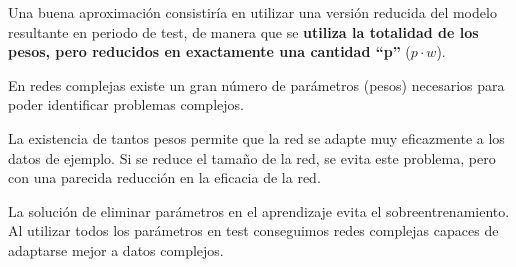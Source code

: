 \documentclass[12pt, twoside, openright]{report} %
\begin{document}
Una buena aproximación consistiría en utilizar una versión reducida del modelo resultante en periodo de test, de manera que se \textbf{utiliza la totalidad de los pesos, pero reducidos en exactamente una cantidad “p”} ($p\cdot w$).

En redes complejas existe un gran número de parámetros (pesos) necesarios para poder identificar problemas complejos.

La existencia de tantos pesos permite que la red se adapte muy eficazmente a los datos de ejemplo. Si se reduce el tamaño de la red, se evita este problema, pero con una parecida reducción en la eficacia de la red.

La solución de eliminar parámetros en el aprendizaje evita el sobreentrenamiento. Al utilizar todos los parámetros en test conseguimos redes complejas capaces de adaptarse mejor a datos complejos.
\end{document}
